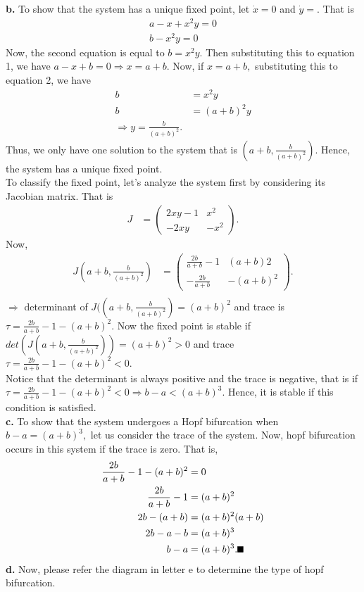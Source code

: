 \documentclass[12pt]{article}
\newcommand{\mycbox}[1]{\tikz{\path[draw=#1,fill=#1] (0,0) rectangle (.2cm,.2cm);}}
\begin{document}
\indent
{\bf b. } To show that the system has a unique fixed point, let $\dot{x}=0$ and $\dot{y}=.$ That is\\
\begin{align}
a-x+x^2y=0\\
b-x^2y=0
\end{align}
Now, the second equation is equal to $b=x^2y$. Then substituting this to equation 1, we have $a-x+b=0 \Rightarrow x=a+b.$ Now, if $x=a+b,$ substituting this to equation 2, we have
\begin{align*}
b&=x^2y\\
b&=(a+b)^2y\\
\Rightarrow y=\frac{b}{(a+b)^2}.
\end{align*}
Thus, we only have one solution to the system that is $\left(a+b,\frac{b}{(a+b)^2}\right).$ Hence, the system has a unique fixed point.\mycbox{black}\\
To classify the fixed point, let's analyze the system first by considering its Jacobian matrix. That is 
\begin{align*}
J&=\left(\begin{array}{cc} 2xy-1 & x^2 \\
-2xy & -x^2
\end{array}\right).
\end{align*}
Now, 
\begin{align*}
J\left(a+b,\frac{b}{(a+b)^2}\right)&=\left(\begin{array}{cc} \frac{2b}{a+b}-1 & (a+b)2 \\
-\frac{2b}{a+b} & -(a+b)^2
\end{array}\right).\\ 
\end{align*}
$\Rightarrow$ determinant of $J(\left(a+b,\frac{b}{(a+b)^2}\right)=(a+b)^2$ and trace is $\tau=\frac{2b}{a+b}-1-(a+b)^2.$ Now the fixed point is stable if $det\left(J\left(a+b,\frac{b}{(a+b)^2}\right)\right)=(a+b)^2>0$ and trace $\tau=\frac{2b}{a+b}-1-(a+b)^2<0$.\\
Notice that the determinant is always positive and the trace is negative, that is if $\tau=\frac{2b}{a+b}-1-(a+b)^2<0\Rightarrow b-a<(a+b)^3.$ Hence, it is stable if this condition is satisfied.\\
\indent
{\bf c. } To show that the system undergoes a Hopf bifurcation when $b-a=(a+b)^3,$ let us consider the trace of the system. Now, hopf bifurcation occurs in this system if the trace is zero. That is,
\begin{align*}
\frac{2b}{a+b}-1-(a+b)^2&=0\\
\frac{2b}{a+b}-1&=(a+b)^2\\
2b-(a+b)&=(a+b)^2(a+b)\\
2b-a-b&=(a+b)^3\\
b-a&=(a+b)^3. \mycbox{black}
\end{align*}
\indent
{\bf d. } Now, please refer the diagram in letter e to determine the type of hopf bifurcation.\\
\end{document}
